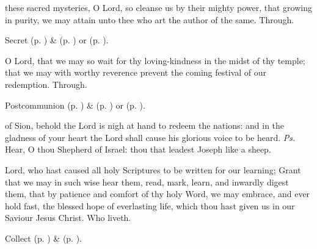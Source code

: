 
\secret\label{AdventISecret}
 these sacred mysteries, O Lord, so cleanse us by their mighty power, that growing in purity, we may attain unto thee who art the author of the same. Through.
\begin{rubric}
     Secret  (p. \pageref{SPMaryInAdvent}) \&   (p. \pageref{SPAgainst}) or  (p. \pageref{SPChiefBishop}).
\end{rubric}
\postcommunion\label{AdventIPostcommunion}
 O Lord, that we may so wait for thy loving-kindness in the midst of thy temple; that we may with worthy reverence prevent the coming festival of our redemption. Through.
\begin{rubric}
     Postcommunion  (p. \pageref{SPMaryInAdvent}) \&   (p. \pageref{SPAgainst}) or  (p. \pageref{SPChiefBishop}).
\end{rubric}




\introit
{} of Sion, behold the Lord is nigh at hand to redeem the nations: and in the gladness of your heart the Lord shall cause his glorious voice to be heard. \textit{Ps.} Hear, O thou Shepherd of Israel: thou that leadest Joseph like a sheep.

\collect
{} Lord, who hast caused all holy Scriptures to be written for our learning; Grant that we may in such wise hear them, read, mark, learn, and inwardly digest them, that by patience and comfort of thy holy Word, we may embrace, and ever hold fast, the blessed hope of everlasting life, which thou hast given us in our Saviour Jesus Christ. Who liveth.

\begin{rubric}
     Collect  (p. \pageref{AdventICollect}) \&   (p. \pageref{SPMaryInAdvent}).
\end{rubric}


